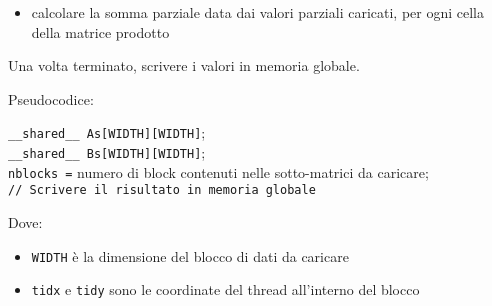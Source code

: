 \begin{questions}
\begin{solution}
\begin{itemize}
    		\item calcolare la somma parziale data dai valori parziali caricati, per ogni cella della matrice prodotto
    	\end{itemize}
    	
    	Una volta terminato, scrivere i valori in memoria globale.
    	
    	Pseudocodice:
    	\begin{center}
    		\begin{minipage}{.9\textwidth}
    			\begin{tcolorbox}[
    				colback=white,
    				sharp corners,
    				boxrule=.3mm,
    				left=20pt,
    				top=0pt,
    				bottom=0pt,
    				colbacktitle=white,
    				coltitle=black
    				]
    				\LinesNumbered
    				\begin{algorithm}[H]
    					\SetAlgoNoEnd
    					\texttt{\_\_shared\_\_ As[WIDTH][WIDTH]}; \\
    					\texttt{\_\_shared\_\_ Bs[WIDTH][WIDTH]}; \\
    					\texttt{nblocks =} numero di block contenuti nelle sotto-matrici da caricare; \\
    					\texttt{// Scrivere il risultato in memoria globale}
    				\end{algorithm}
    			\end{tcolorbox}
    		\end{minipage}
    	\end{center}
        
        Dove: 
        \begin{itemize}
            \item \texttt{WIDTH} è la dimensione del blocco di dati da caricare
            
            \item \texttt{tidx} e \texttt{tidy} sono le coordinate del thread all'interno del blocco
        

\end{itemize}
\end{solution}
\end{questions}
